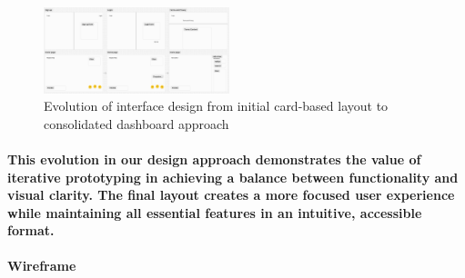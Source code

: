 \begin{figure}[h]
    \centering
    \includegraphics[width=0.48\textwidth]{images/sketch.jpg}
    \caption{Evolution of interface design from initial card-based layout to consolidated dashboard approach}
    \label{fig:prototype-evolution}
\end{figure}

\paragraph{This evolution in our design approach demonstrates the value of iterative prototyping in achieving a balance between functionality and visual clarity. The final layout creates a more focused user experience while maintaining all essential features in an intuitive, accessible format.}

\item \textbf{Wireframe}
